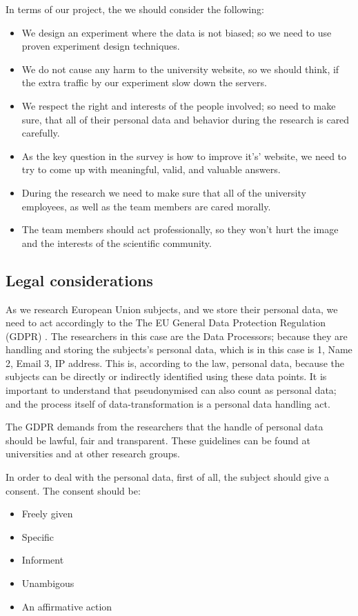 \documentclass[12pt,a4paper,paper=a4,oneside,titlepage,pdftex]{scrartcl}
\begin{document}
In terms of our project, the we should consider the following:
\begin{itemize}
	\item We design an experiment where the data is not biased; so we need to use proven experiment design techniques.
	\item We do not cause any harm to the university website, so we should think, if the extra traffic by our experiment slow down the servers.
	\item We respect the right and interests of the people involved; so need to make sure, that all of their personal data and behavior during the research is cared carefully.
	\item As the key question in the survey is how to improve it's' website, we need to try to come up with meaningful, valid, and valuable answers.
	\item During the research we need to make sure that all of the university employees, as well as the team members are cared morally.
	\item The team members should act professionally, so they won't hurt the image and the interests of the scientific community.
\end{itemize}

\subsection{Legal considerations}

As we research European Union subjects, and we store their personal data, we need to act accordingly to the The EU General Data Protection Regulation (GDPR) \citep{voigt2017eu}. The researchers in this case are the Data Processors; because they are handling and storing the subjects's personal data, which is in this case is 1, Name 2, Email 3, IP address. This is, according to the law, personal data, because the subjects can be directly or indirectly identified using these data points. It is important to understand that pseudonymised can also count as personal data; and the process itself of data-transformation is a personal data handling act.

The GDPR demands from the researchers that the handle of personal data should be lawful, fair and transparent. These guidelines can be found at universities and at other research groups.

In order to deal with the personal data, first of all, the subject should give a consent. The consent should be:
\begin{itemize}
	\item Freely given
	\item Specific
	\item Informent
	\item Unambigous
	\item An affirmative action	
\end{itemize}
\end{document}
